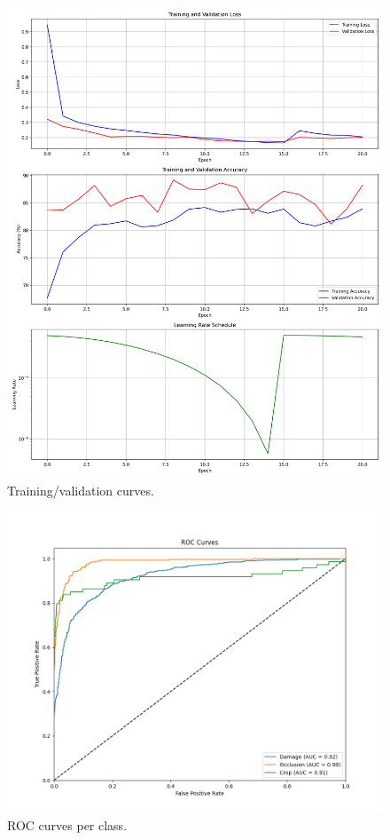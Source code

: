 \documentclass[12pt,twocolumn]{article}
\begin{document}
\begin{figure}[!htb]
  \centering
  \includegraphics[width=0.9\linewidth]{images/training_progress.png}
  \caption{Training/validation curves.}
\end{figure}

\begin{figure}[!htb]
  \centering
  \includegraphics[width=0.9\linewidth]{images/roc_curves.png}
  \caption{ROC curves per class.}
\end{figure}
\end{document}
